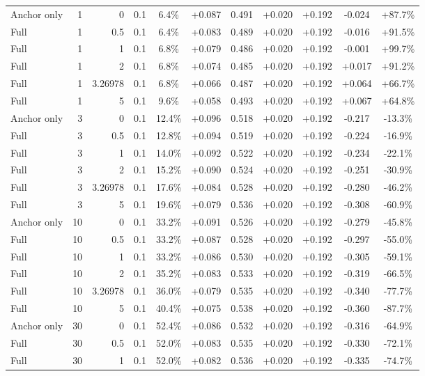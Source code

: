 \begin{table}[htbp]
\begin{tabular}{lrrrccccccc}
Anchor only & 1 & 0 & 0.1 & 6.4\% & +0.087 & 0.491 & +0.020 & +0.192 & -0.024 & +87.7\% \\
Full & 1 & 0.5 & 0.1 & 6.4\% & +0.083 & 0.489 & +0.020 & +0.192 & -0.016 & +91.5\% \\
Full & 1 & 1 & 0.1 & 6.8\% & +0.079 & 0.486 & +0.020 & +0.192 & -0.001 & +99.7\% \\
Full & 1 & 2 & 0.1 & 6.8\% & +0.074 & 0.485 & +0.020 & +0.192 & +0.017 & +91.2\% \\
Full & 1 & 3.26978 & 0.1 & 6.8\% & +0.066 & 0.487 & +0.020 & +0.192 & +0.064 & +66.7\% \\
Full & 1 & 5 & 0.1 & 9.6\% & +0.058 & 0.493 & +0.020 & +0.192 & +0.067 & +64.8\% \\
Anchor only & 3 & 0 & 0.1 & 12.4\% & +0.096 & 0.518 & +0.020 & +0.192 & -0.217 & -13.3\% \\
Full & 3 & 0.5 & 0.1 & 12.8\% & +0.094 & 0.519 & +0.020 & +0.192 & -0.224 & -16.9\% \\
Full & 3 & 1 & 0.1 & 14.0\% & +0.092 & 0.522 & +0.020 & +0.192 & -0.234 & -22.1\% \\
Full & 3 & 2 & 0.1 & 15.2\% & +0.090 & 0.524 & +0.020 & +0.192 & -0.251 & -30.9\% \\
Full & 3 & 3.26978 & 0.1 & 17.6\% & +0.084 & 0.528 & +0.020 & +0.192 & -0.280 & -46.2\% \\
Full & 3 & 5 & 0.1 & 19.6\% & +0.079 & 0.536 & +0.020 & +0.192 & -0.308 & -60.9\% \\
Anchor only & 10 & 0 & 0.1 & 33.2\% & +0.091 & 0.526 & +0.020 & +0.192 & -0.279 & -45.8\% \\
Full & 10 & 0.5 & 0.1 & 33.2\% & +0.087 & 0.528 & +0.020 & +0.192 & -0.297 & -55.0\% \\
Full & 10 & 1 & 0.1 & 33.2\% & +0.086 & 0.530 & +0.020 & +0.192 & -0.305 & -59.1\% \\
Full & 10 & 2 & 0.1 & 35.2\% & +0.083 & 0.533 & +0.020 & +0.192 & -0.319 & -66.5\% \\
Full & 10 & 3.26978 & 0.1 & 36.0\% & +0.079 & 0.535 & +0.020 & +0.192 & -0.340 & -77.7\% \\
Full & 10 & 5 & 0.1 & 40.4\% & +0.075 & 0.538 & +0.020 & +0.192 & -0.360 & -87.7\% \\
Anchor only & 30 & 0 & 0.1 & 52.4\% & +0.086 & 0.532 & +0.020 & +0.192 & -0.316 & -64.9\% \\
Full & 30 & 0.5 & 0.1 & 52.0\% & +0.083 & 0.535 & +0.020 & +0.192 & -0.330 & -72.1\% \\
Full & 30 & 1 & 0.1 & 52.0\% & +0.082 & 0.536 & +0.020 & +0.192 & -0.335 & -74.7\% \\

\end{tabular}
\end{table}
